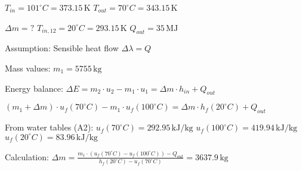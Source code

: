 \( T_{in} = 101^\circ C = 373.15 \, \text{K} \)  
\( T_{out} = 70^\circ C = 343.15 \, \text{K} \)  

\( \Delta m = ? \)  
\( T_{in,12} = 20^\circ C = 293.15 \, \text{K} \)  
\( Q_{out} = 35 \, \text{MJ} \)  

Assumption:  
Sensible heat flow \( \Delta \lambda = Q \)  

Mass values:  
\( m_1 = 5755 \, \text{kg} \)  

Energy balance:  
\( \Delta E = m_2 \cdot u_2 - m_1 \cdot u_1 = \Delta m \cdot h_{in} + Q_{out} \)  

\( (m_1 + \Delta m) \cdot u_f(70^\circ C) - m_1 \cdot u_f(100^\circ C) = \Delta m \cdot h_f(20^\circ C) + Q_{out} \)  

From water tables (A2):  
\( u_f(70^\circ C) = 292.95 \, \text{kJ/kg} \)  
\( u_f(100^\circ C) = 419.94 \, \text{kJ/kg} \)  
\( u_f(20^\circ C) = 83.96 \, \text{kJ/kg} \)  

Calculation:  
\( \Delta m = \frac{m_1 \cdot (u_f(70^\circ C) - u_f(100^\circ C)) - Q_{out}}{h_f(20^\circ C) - u_f(70^\circ C)} = 3637.9 \, \text{kg} \)